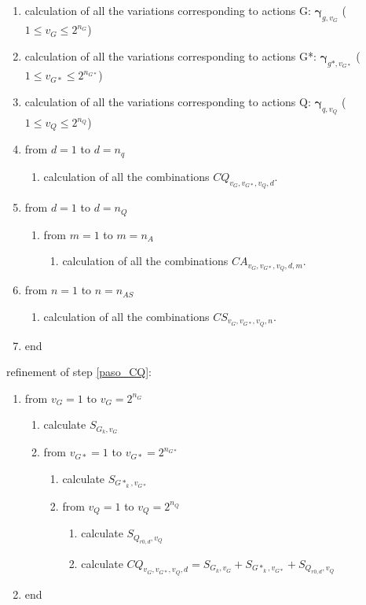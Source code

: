 \begin{enumerate}
\item calculation of all the variations corresponding to actions G: $\mathbf{\gamma}_{g,v_G}$ ($1 \leq v_G \leq 2^{n_G}$)
\item calculation of all the variations corresponding to actions G*: $\mathbf{\gamma}_{g*,v_{G*}}$ ($1 \leq v_{G*} \leq 2^{n_{G*}}$)
\item calculation of all the variations corresponding to actions Q: $\mathbf{\gamma}_{q,v_Q}$ ($1 \leq v_Q \leq 2^{n_Q}$)
\item from $d=1$ to $d=n_q$
  \begin{enumerate}
  \item calculation of all the combinations $CQ_{v_G,v_{G*},v_Q,d}$. \label{paso_CQ}
  \end{enumerate}
\item from $d=1$ to $d=n_Q$
  \begin{enumerate}
  \item from $m=1$ to $m=n_A$
    \begin{enumerate}
      \item calculation of all the combinations $CA_{v_G,v_{G*},v_Q,d,m}$. \label{paso_CA}
    \end{enumerate}
  \end{enumerate}
  \item from $n=1$ to $n=n_{AS}$
    \begin{enumerate}
      \item calculation of all the combinations $CS_{v_G,v_{G*},v_Q,n}$. \label{paso_CS}
    \end{enumerate}
\item end
\end{enumerate}

\noindent refinement of step \ref{paso_CQ}:
\begin{enumerate}
\item from $v_G=1$ to $v_G=2^{n_G}$
\begin{enumerate}
\item calculate $S_{G_k,v_G}$
\item from $v_{G*}=1$ to $v_{G*}=2^{n_{G*}}$
\begin{enumerate}
\item calculate $S_{G*_k,v_{G*}}$
\item from $v_Q=1$ to $v_Q=2^{n_Q}$
\begin{enumerate}
\item calculate $S_{Q_{r0,d},v_Q}$
\item calculate $CQ_{v_G,v_{G*},v_Q,d}= S_{G_k,v_G}+S_{G*_k,v_{G*}}+S_{Q_{r0,d},v_Q}$
\end{enumerate}
\end{enumerate}
\end{enumerate}
\item end
\end{enumerate}

